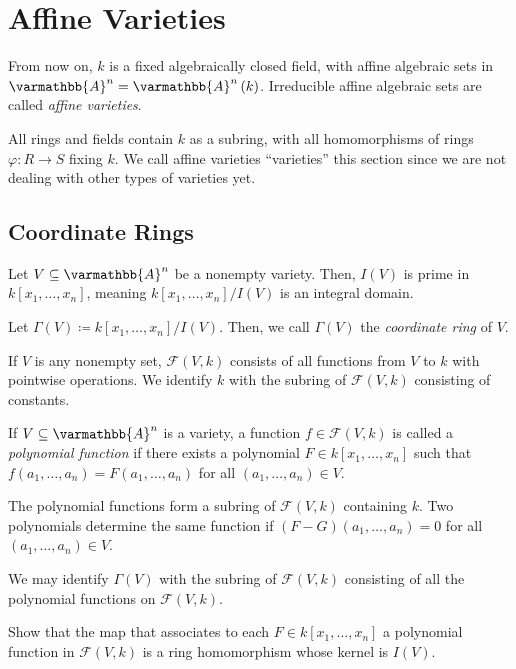 \documentclass[10pt]{mypackage}
\renewcommand*{\mathbb}[1]{\varmathbb{#1}}
\newcommand{\A}{\mathbb{A}}
\begin{document}
\section{Affine Varieties}%
From now on, $k$ is a fixed algebraically closed field, with affine algebraic sets in $\A^n = \A^n\left( k \right)$. Irreducible affine algebraic sets are called \textit{affine varieties}.\newline

All rings and fields contain $k$ as a subring, with all homomorphisms of rings $\varphi\colon R\rightarrow S$ fixing $k$. We call affine varieties ``varieties'' this section since we are not dealing with other types of varieties yet.
\subsection{Coordinate Rings}%
Let $V\subseteq \A^n$ be a nonempty variety. Then, $I(V)$ is prime in $k\left[ x_1,\dots,x_n \right]$, meaning $k\left[ x_1,\dots,x_n \right]/I(V)$ is an integral domain.
\begin{definition}
  Let $\Gamma(V)\coloneq k\left[ x_1,\dots,x_n \right]/I(V)$. Then, we call $\Gamma\left( V \right)$ the \textit{coordinate ring} of $V$.
\end{definition}
If $V$ is any nonempty set, $\mathcal{F}\left( V,k \right)$ consists of all functions from $V$ to $k$ with pointwise operations. We identify $k$ with the subring of $\mathcal{F}\left( V,k \right)$ consisting of constants.
\begin{definition}
  If $V\subseteq \A^n$ is a variety, a function $f\in \mathcal{F}\left( V,k \right)$ is called a \textit{polynomial function} if there exists a polynomial $F\in k\left[ x_1,\dots,x_n \right]$ such that $f\left( a_1,\dots,a_n \right) = F\left( a_1,\dots,a_n \right)$ for all $\left( a_1,\dots,a_n \right)\in V$.\newline

  The polynomial functions form a subring of $\mathcal{F}\left( V,k \right)$ containing $k$. Two polynomials determine the same function if $\left( F-G \right)\left( a_1,\dots,a_n \right) = 0$ for all $\left( a_1,\dots,a_n \right)\in V$.\newline

  We may identify $\Gamma\left( V \right)$ with the subring of $\mathcal{F}\left( V,k \right)$ consisting of all the polynomial functions on $\mathcal{F}\left( V,k \right)$.
\end{definition}
\begin{exercise}[Exercise 2.1]
  Show that the map that associates to each $F\in k\left[ x_1,\dots,x_n \right]$ a polynomial function in $\mathcal{F}\left( V,k \right)$ is a ring homomorphism whose kernel is $I(V)$.
\end{exercise}
\end{document}
